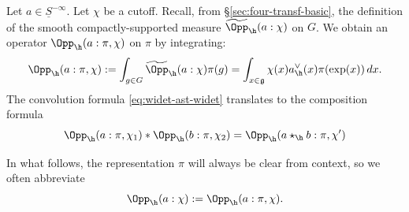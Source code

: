 Let $a \in \underline{S}^{- \infty}$.  Let $\chi$ be a cutoff.  Recall, from \S\ref{sec:four-transf-basic}, the definition of the smooth compactly-supported measure $\widetilde{\Opp}_{\h}(a:\chi)$ on $G$.  We obtain an operator $\Opp_{\h}(a:\pi,\chi)$ on $\pi$ by integrating: 
\begin{equation*}
  \Opp_{\h}(a:\pi,\chi) := \int_{g \in G} \widetilde{\Opp}_{\h}(a:\chi) \pi(g)
  =
  \int_{x \in \mathfrak{g} } \chi(x) a_{\h}^\vee(x) \pi(\exp(x)) \, d x.
\end{equation*}
The convolution formula \eqref{eq:widet-ast-widet} translates to the composition formula
\begin{equation}\label{eq:composition-formula-most-basic}
  {\Opp}_{\h}(a:\pi,\chi_1) \ast
  {\Opp}_{\h}(b:\pi,\chi_2)
  =
  {\Opp}_{\h}(a \star_{\h} b:\pi,\chi')
\end{equation}

In what follows, the representation $\pi$ will always be clear from context, so we often abbreviate
\begin{equation*}
  \Opp_{\h}(a:\chi) := \Opp_{\h}(a:\pi,\chi).
\end{equation*}


